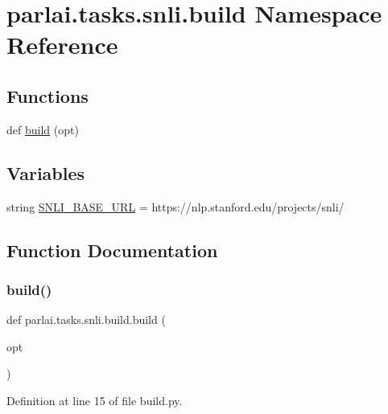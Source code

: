 \hypertarget{namespaceparlai_1_1tasks_1_1snli_1_1build}{}\section{parlai.\+tasks.\+snli.\+build Namespace Reference}
\label{namespaceparlai_1_1tasks_1_1snli_1_1build}
\subsection*{Functions}
\begin{DoxyCompactItemize}
\item 
def \hyperlink{namespaceparlai_1_1tasks_1_1snli_1_1build_a525584627ce716e22d77dd663be2c2ba}{build} (opt)
\end{DoxyCompactItemize}
\subsection*{Variables}
\begin{DoxyCompactItemize}
\item 
string \hyperlink{namespaceparlai_1_1tasks_1_1snli_1_1build_ac49c729bf968f245cc2dba26f15e2fb8}{S\+N\+L\+I\+\_\+\+B\+A\+S\+E\+\_\+\+U\+RL} = \textquotesingle{}https\+://nlp.\+stanford.\+edu/projects/snli/\textquotesingle{}
\end{DoxyCompactItemize}


\subsection{Function Documentation}
\mbox{\label{namespaceparlai_1_1tasks_1_1snli_1_1build_a525584627ce716e22d77dd663be2c2ba}} 
\subsubsection{\texorpdfstring{build()}{build()}}
{\footnotesize\ttfamily def parlai.\+tasks.\+snli.\+build.\+build (\begin{DoxyParamCaption}\item[{}]{opt }\end{DoxyParamCaption})}



Definition at line 15 of file build.\+py.



